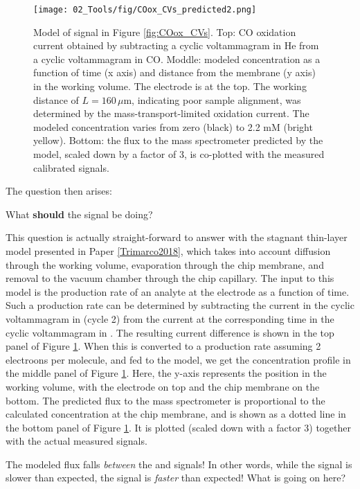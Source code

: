 \begin{figure}[h!]
	\centering
	\texttt{[image: 02\_Tools/fig/COox\_CVs\_predicted2.png]}
	\caption{Model of  signal in Figure \ref{fig:COox_CVs}. Top: CO oxidation current obtained by subtracting a cyclic voltammagram in He from a cyclic voltammagram in CO. Moddle: modeled concentration as a function of time (x axis) and distance from the membrane (y axis) in the working volume. The electrode is at the top. The working distance of $L=160\,\mu$m, indicating poor sample alignment, was determined by the mass-transport-limited  oxidation current. The modeled  concentration varies from zero (black) to 2.2 mM (bright yellow). Bottom: the  flux to the mass spectrometer predicted by the model, scaled down by a factor of 3, is co-plotted with the measured calibrated  signals.}
	\label{fig:COox_pred}
\end{figure}
The question then arises:
\begin{question} 
What \textbf{should} the  signal be doing?
\end{question}
This question is actually straight-forward to answer with the stagnant thin-layer model presented in Paper \ref{Trimarco2018}, which takes into account diffusion through the working volume, evaporation through the chip membrane, and removal to the vacuum chamber through the chip capillary. The input to this model is the production rate of an analyte at the electrode as a function of time. Such a production rate can be determined by subtracting the current in the cyclic voltammagram in  (cycle 2) from the current at the corresponding time in the cyclic voltammagram in . The resulting current difference is shown in the top panel of Figure \ref{fig:COox_pred}. When this is converted to a  production rate assuming 2 electroons per  molecule, and fed to the model, we get the concentration profile in the middle panel of Figure \ref{fig:COox_pred}. Here, the y-axis represents the position in the working volume, with the electrode on top and the chip membrane on the bottom. The predicted flux to the mass spectrometer is proportional to the calculated concentration at the chip membrane, and is shown as a dotted line in the bottom panel of Figure \ref{fig:COox_pred}. It is plotted (scaled down with a factor 3) together with the actual measured  signals.

The modeled flux falls \textit{between} the  and  signals! In other words, while the  signal is slower than expected, the  signal is \textit{faster} than expected! What is going on here?

